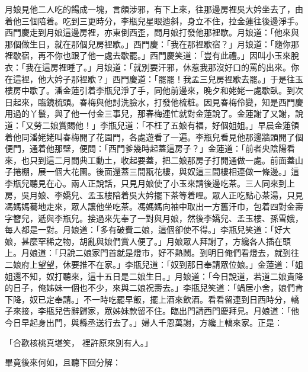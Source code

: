 \begin{showcontents}{}
月娘見他二人吃的餳成一塊，言頗涉邪，有下上來，往那邊房裡吳大妗坐去了，由着他三個陪着。吃到三更時分，李瓶兒星眼迆斜，身立不住，拉金蓮往後邊淨手。西門慶走到月娘這邊房裡，亦東倒西歪，問月娘打發他那裡歇。月娘道：「他來與那個做生日，就在那個兒房裡歇。」西門慶：「我在那裡歇宿？」月娘道：「隨你那裡歇宿，再不你也跟了他一處去歇罷。」西門慶笑道：「豈有此禮。」因叫小玉來脫衣：「我在這房裡睡了。」月娘道：「就別要汗邪，休惹我那沒好口的罵的出來。你在這裡，他大妗子那裡歇？」西門慶道：「罷罷！我孟三兒房裡歇去罷。」于是往玉樓房中歇了。潘金蓮引着李瓶兒淨了手，同他前邊來，晚夕和姥姥一處歇臥。到次日起來，臨鏡梳頭。春梅與他討洗臉水，打發他梳粧。因見春梅伶變，知是西門慶用過的丫鬟，與了他一付金三事兒，那春梅連忙就對金蓮說了。金蓮謝了又謝，說道：「又勞二娘賞賜他！」李瓶兒道：「不枉了五娘有福，好個姐姐。」早晨金蓮領着他同潘姥姥叫春梅開了花園門，各處遊看了一遍。李瓶兒看見他那邊牆頭開了個便門，通着他那壁，便問：「西門爹幾時起蓋這房子？」金蓮道：「前者央陰陽看來，也只到這二月間典工動土，收起要蓋，把二娘那房子打開通做一處。前面蓋山子捲棚，展一個大花園。後面還蓋三間翫花樓，與奴這三間樓相連做一條邊。」這李瓶兒聽見在心。兩人正說話，只見月娘使了小玉來請後邊吃茶。三人同來到上房，吳月娘、李嬌兒、孟玉樓陪着吳大妗擺下茶等着哩。眾人正吃點心茶湯，只見馮媽媽驀地走來，眾人讓他坐吃茶。馮媽媽向袖中取出一方舊汗巾，包着四對金壽字簪兒，遞與李瓶兒。接過來先奉了一對與月娘，然後李嬌兒、孟玉樓、孫雪娥，每人都是一對。月娘道：「多有破費二娘，這個卻使不得。」李瓶兒笑道：「好大娘，甚麼罕稀之物，胡亂與娘們賞人便了。」月娘眾人拜謝了，方纔各人插在頭上。月娘道：「只說二娘家門首就是燈市，好不熱鬧。到明日俺們看燈去，就到往二娘府上望望，休要推不在家。」李瓶兒道：「奴到那日奉請眾位娘。」金蓮道：「姐姐還不知，奴打聽來，這十五日是二娘生日。」月娘道：「今日說道，若道二娘貴降的日子，俺姊妹一個也不少，來與二娘祝壽去。」李瓶兒笑道：「蝸居小舍，娘們肯下降，奴已定奉請。」不一時吃罷早飯，擺上酒來飲酒。看看留連到日西時分，轎子來接，李瓶兒告辭歸家，眾姊妹款留不住。臨出門請西門慶拜見。月娘道：「他今日早起身出門，與縣丞送行去了。」婦人千恩萬謝，方纔上轎來家。正是：

「合歡核桃真堪笑，  裡許原來別有人。」

畢竟後來何如，且聽下回分解：





\end{showcontents}
